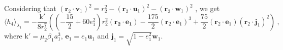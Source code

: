\documentclass[a4paper]{article}
\begin{document}
\begin{comment}
\begin{align}
\implies
\quad
 \langle (\mathbf{r_{2} \cdot r_{1}})^{3} \rangle _{\lambda_{1}}&=\frac{a_{1}^{3}}{8}((-15e_{1}-20e_{1}^{3})(\mathbf{r_{2} \cdot u_{1}})^{3}+(-15e_{1}+15e_{1}^{3})(\mathbf r_{2} \cdot \mathbf u_{1})(\mathbf r_{2} \cdot \mathbf v_{1})^{2}) \ , \\
  \langle (\mathbf{r_{2} \cdot r_{1}})r_{1}^{2} \rangle _{\lambda_{1}}&=\frac{a_{1}^{3}}{8}((-20e_{1}-15e_{1}^{3}) \ .
\end{align}
\end{comment}
Considering that $(\mathbf r_{2} \cdot \mathbf v_{1})^{2}=r_{2}^{2}-(\mathbf r_{2} \cdot \mathbf u_{1})^{2}-(\mathbf r_{2} \cdot \mathbf w_{1})^{2}$ , we get 
\begin{equation}
 \langle h_{4} \rangle _{\lambda_{1}} = -\frac{\mathrm k'}{8r_{2}^{7}} \left((-\frac{15}{2}+60e_{1}^{2})r_{2}^{2}(\mathbf{r_{2} \cdot e_{1}})
-\frac{175}{2}(\mathbf r_{2} \cdot \mathbf e_{1})^{3}+\frac{75}{2}(\mathbf r_{2} \cdot \mathbf e_{1})(\mathbf r_{2} \cdot \mathbf j_{1})^{2} \right) \ ,
\end{equation}
where $\mathrm k'=\mu_{2}\beta_{1}a_{1}^{3}$, \; $\mathbf e_{1}=e_{1}\mathbf u_{1}$ and $\mathbf j_{1}=\sqrt{1-e_{1}^{2}}\mathbf w_{1}$. \\
\end{document}
